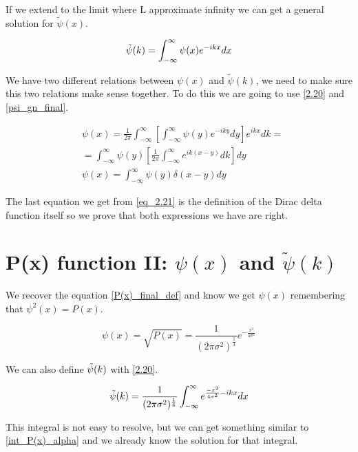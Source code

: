 If we extend to the limit where L approximate infinity we can get a general solution for $\tilde{\psi}(x)$.

\begin{equation}
    \label{2.20}
    \Tilde{\psi}(k) = \int_{-\infty}^{\infty} \psi(x) e^{-ikx} dx
\end{equation}

We have two different relations between $\psi(x)$ and $\tilde{\psi}(k)$, we need to make sure this two relations make sense together. To do this we are going to use \ref{2.20} and \ref{psi_gn_final}.

\begin{equation}
    \label{eq_2.21} 
\begin{split}
    & \psi(x) = \frac{1}{2\pi} \int_{-\infty}^{\infty} \left[ \int_{-\infty}^{\infty} \psi(y)e^{-iky}dy \right]e^{ikx}dk = 
    \\
    & = \int_{-\infty}^{\infty} \psi(y) \left[ \frac{1}{2\pi} \int_{-\infty}^{\infty} e^{ik(x-y)}dk\right]dy 
    \\
    & \psi(x) = \int_{-\infty}^{\infty} \psi(y) \delta(x-y) dy
    \end{split}
\end{equation}

The last equation we get from \ref{eq_2.21} is the definition of the Dirac delta function itself so we prove that both expressions we have are right.

\section{P(x) function II: $\psi(x)$ and $\tilde{\psi}(k)$}

We recover the equation \ref{P(x)_final_def} and know we get $\psi(x)$ remembering that $\psi^2(x) = P(x)$.

\begin{equation}
    \label{2.22}
    \psi(x) = \sqrt{P(x)} = \frac{1}{(2\pi\sigma^2)^{\frac{1}{4}} } e^{-\frac{x^2}{4\sigma^2}}
\end{equation}

We can also define $\Tilde{\psi}(k)$ with \ref{2.20}. 

\begin{equation}
    \label{2.23}
    \Tilde{\psi}(k) = \frac{1}{(2\pi\sigma^2)^{\frac{1}{4}} } \int_{-\infty}^{\infty} e^{\frac{-x^2}{4\sigma^2}-ikx}dx
\end{equation}

This integral is not easy to resolve, but we can get something similar to \ref{int_P(x)_alpha} and we already know the solution for that integral.

